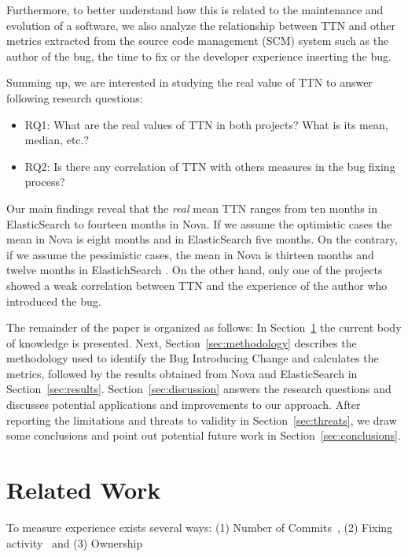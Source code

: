 \documentclass[10pt, conference]{IEEEtran}
\begin{document}
Furthermore, to better understand how this is related to the maintenance and evolution of a software, we also analyze the relationship between TTN and other metrics extracted from the source code management (SCM) system such as the author of the bug, the time to fix or the developer experience inserting the bug.

Summing up, we are interested in studying the real value of TTN to answer following research questions:

\begin{itemize}
\item RQ1: What are the real values of TTN in both projects? What is its mean, median, etc.?
\item RQ2: Is there any correlation of TTN with others measures in the bug fixing process?
\end{itemize}

Our main findings reveal that the \emph{real} mean TTN ranges from ten months in ElasticSearch to fourteen months in Nova. If we assume the optimistic cases the mean in Nova is eight months and in ElasticSearch five months. On the contrary, if we assume the pessimistic cases, the mean in Nova is thirteen months and twelve months in ElastichSearch . On the other hand, only one of the projects showed a weak correlation between TTN and the experience of the author who introduced the bug.

The remainder of the paper is organized as follows: In Section~\ref{sec:relatedwork} the current body of knowledge is presented. Next, Section~\ref{sec:methodology} describes the methodology used to identify the Bug Introducing Change and calculates the metrics, followed by the results obtained from Nova and ElasticSearch in Section~\ref{sec:results}. Section~\ref{sec:discussion} answers the research questions and discusses potential applications and improvements to our approach. After reporting the limitations and threats to validity in Section~\ref{sec:threats}, we draw some conclusions and point out potential future work in Section~\ref{sec:conclusions}.

\section{Related Work}
\label{sec:relatedwork}

To measure experience exists several ways: (1) Number of Commits~\cite{eyolfson2011time}, (2) Fixing activity~\cite{ahsan2010mining} and (3) Ownership~\cite{german2004using}
\end{document}
